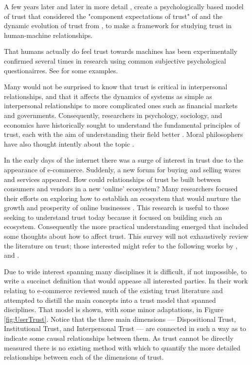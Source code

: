     A few years later \cite{Muir1987-mk} and later in more detail \cite{Muir1994-ow}, create a psychologically based model of trust that considered the "component expectations of trust" of \cite{Barber1983-yc} and the dynamic evolution of trust from \cite{Rempel1985-sg}, to make a framework for studying trust in human-machine relationships.

    That humans actually do feel trust towards machines has been experimentally confirmed several times in research using common subjective psychological questionairres. See \cite{Muir1996-gt,Reeves1997-ad,Groom2007-bz,Mcknight2011-gv,Riley1996-qm,Bainbridge2011-pl,Kaniarasu2012-mo,Salem2015-md,Desai2012-rc, Freedy2007-sg, Wang2016-id, Inagaki1998-cl, Kaniarasu2013-ho} for some examples.

    Many would not be surprised to know that trust is critical in interpersonal relationships, and that it affects the dynamics of systems as simple as interpersonal relationships to more complicated ones such as financial markets \cite{Fukuyama1995-un} and governments. Consequently, researchers in psychology, sociology, and economics have historically sought to understand the fundamental principles of trust, each with the aim of understanding their field better \cite{Gambetta1988-pi}. Moral philosophers have also thought intently about the topic \cite{Baier1986-im}.

    In the early days of the internet there was a surge of interest in trust due to the appearance of e-commerce. Suddenly, a new forum for buying and selling wares and services appeared. How could relationships of trust be built between consumers and vendors in a new `online' ecosystem? Many researchers focused their efforts on exploring how to establish an ecosystem that would nurture the growth and prosperity of online businesses \cite{McKnight2001-fa}. This research is useful to those seeking to understand trust today because it focused on building such an ecosystem. Consequently the more practical understanding emerged that included some thoughts about how to affect trust. This survey will not exhaustively review the literature on trust; those interested might refer to the following works by \citet{McKnight2001-fa}, and \citet{Lewicki2006-hj}.

    Due to wide interest spanning many disciplines it is difficult, if not impossible, to write a succinct definition that would appease all interested parties. In their work relating to e-commerce \citet{McKnight2001-fa} reviewed much of the existing trust literature and attempted to distill the main concepts into a trust model that spanned disciplines. That model is shown, with some minor adaptations, in Figure \ref{fig:UserTrust}. Notice that the three main dimensions --- Dispositional Trust, Institutional Trust, and Interpersonal Trust --- are connected in such a way as to indicate some causal relationships between them. As trust cannot be directly measured there is no existing method with which to quantify the more detailed relationships between each of the dimensions of trust.

